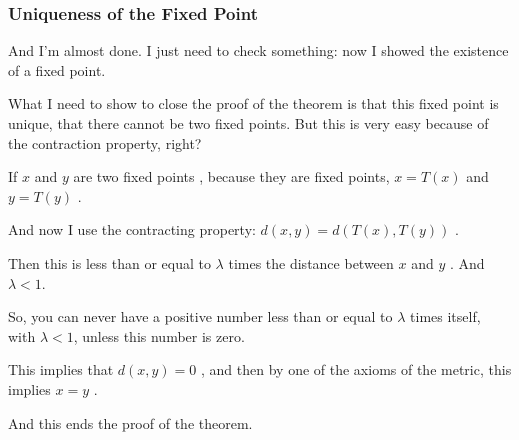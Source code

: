 \begin{proofWrapper}
\subsubsection{Uniqueness of the Fixed Point}

\begin{speech}[00:37:50 - 00:38:44]
And I'm almost done. I just need to check something: now I showed the existence of a fixed point.

What I need to show to close the proof of the theorem is that this fixed point is unique, that there cannot be two fixed points. But this is very easy because of the contraction property, right?

If $x$ and $y$ are two fixed points , because they are fixed points, $x = T(x)$  and $y = T(y)$ .

And now I use the contracting property: $d(x, y) = d(T(x), T(y))$ .
\end{speech}

\begin{speech}[00:38:44 - 00:39:49]
Then this is less than or equal to $\lambda$ times the distance between $x$ and $y$ . And $\lambda < 1$.

So, you can never have a positive number less than or equal to $\lambda$ times itself, with $\lambda < 1$, unless this number is zero.

This implies that $d(x, y) = 0$ , and then by one of the axioms of the metric, this implies $x = y$ .

And this ends the proof of the theorem. 
\end{speech}


\end{proofWrapper}
